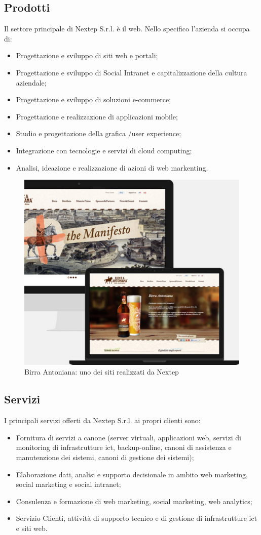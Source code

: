 \subsection{Prodotti}

Il settore principale di Nextep S.r.l. è il web. Nello specifico l'azienda si occupa di:
\begin{itemize}
	\item Progettazione e sviluppo di siti web e portali;
	\item Progettazione e sviluppo di Social Intranet e capitalizzazione della cultura aziendale;
	\item Progettazione e sviluppo di soluzioni e-commerce;
	\item Progettazione e realizzazione di applicazioni mobile;
	\item Studio e progettazione della grafica /user experience;
	\item Integrazione con tecnologie e servizi di cloud computing;
	\item Analisi, ideazione e realizzazione di azioni di web markenting.
\end{itemize}

\begin{figure}[h]
\centering
\includegraphics[width=0.5\linewidth]{immagini/sito}
\caption[Birra Antoniana: uno dei siti realizzati da Nextep]{Birra Antoniana: uno dei siti realizzati da Nextep}
\label{fig:sito}
\end{figure}


\subsection{Servizi}

I principali servizi offerti da Nextep S.r.l. ai propri clienti sono:
\begin{itemize}
	\item Fornitura di servizi a canone (server virtuali, applicazioni web, servizi di monitoring di infrastrutture \gls{ict}, backup-online, canoni di assistenza e manutenzione dei sistemi, canoni di gestione dei sistemi);
	\item Elaborazione dati, analisi e supporto decisionale in ambito web marketing, social marketing e social intranet;
	\item Consulenza e formazione di web marketing, social marketing, web analytics;
	\item Servizio Clienti, attività di supporto tecnico e di gestione di infrastrutture \gls{ict} e siti web.
\end{itemize}

